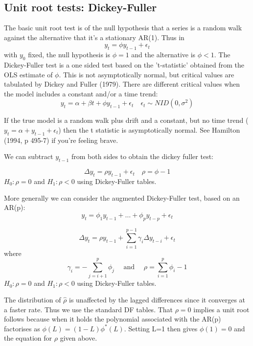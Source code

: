 \documentclass[DIV=14,titlepage=false]{scrreprt}
\begin{document}
\subsection{Unit root tests: Dickey-Fuller}
The basic unit root test is of the null hypothesis that a series is a random walk against the alternative that it's a stationary AR(1). Thus in
\[
    y_t = \phi y_{t-1} + \epsilon_t
\]
with $y_0$ fixed, the null hypothesis is $\phi = 1$ and the alternative is $\phi < 1$. The Dickey-Fuller test is a one sided test based on the 't-statistic' obtained from the OLS estimate of $\phi$. This is not asymptotically normal, but critical values are tabulated by Dickey and Fuller (1979). There are different critical values when the model includes a constant and/or a time trend:
\[
    y_t = \alpha + \beta t + \phi y_{t-1} + \epsilon_t \quad \epsilon_t \sim NID(0,\sigma^2)
\]
\begin{note}
    If the true model is a random walk plus drift and a constant, but no time trend ($y_t = \alpha + y_{t-1} + \epsilon_t$) then the t statistic is asymptotically normal. See Hamilton (1994, p 495-7) if you're feeling brave.
\end{note}
We can subtract $y_{t-1}$ from both sides to obtain the dickey fuller test:
\begin{definition}
    \[
        \Delta y_t = \rho y_{t-1} + \epsilon_t \quad \rho = \phi - 1
    \]
    $H_0: \rho = 0$ and $H_1: \rho < 0$ using Dickey-Fuller tables.
\end{definition}
More generally we can consider the augmented Dickey-Fuller test, based on an AR(p):
\[
    y_t = \phi_1 y_{t-1} + \ldots + \phi_p y_{t-p} + \epsilon_t
\]
\begin{definition}
    \[
        \Delta y_t = \rho y_{t-1} + \sum_{i=1}^{p-1} \gamma_i \Delta y_{t-i} + \epsilon_t
    \]
    where
    \[
        \gamma_i = -\sum_{j=i+1}^p \phi_j \quad \text{ and } \quad \rho = \sum_{i=1}^p \phi_i - 1
    \]
    $H_0: \rho = 0$ and $H_1: \rho < 0$ using Dickey-Fuller tables.
\end{definition}
The distribution of $\hat \rho$ is unaffected by the lagged differences since it converges at a faster rate. Thus we use the standard DF tables. That $\rho = 0$ implies a unit root follows because when it holds the polynomial associated with the AR(p) factorises as $\phi(L) = (1-L) \phi^*(L)$. Setting L=1 then gives $\phi(1) = 0$ and the equation for $\rho$ given above.
\end{document}
